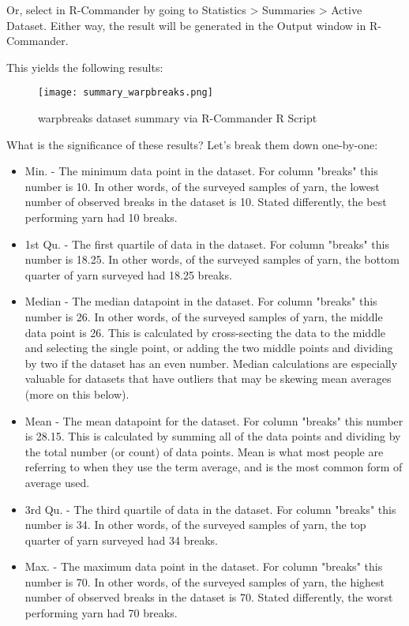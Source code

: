 Or, select in R-Commander by going to Statistics > Summaries > Active Dataset. Either way, the result will be generated in the Output window in R-Commander.

This yields the following results:

\begin{figure}[h!]
\texttt{[image: summary\_warpbreaks.png]}
 \caption{warpbreaks dataset summary via R-Commander R Script}
 \label{fig:summary_warpbreaks}
\end{figure}

What is the significance of these results? Let's break them down one-by-one:

\begin{itemize}
 \item Min. - The minimum data point in the dataset. For column "breaks" this number is 10. In other words, of the surveyed samples of yarn, the lowest number of observed breaks in the dataset is 10. Stated differently, the best performing yarn had 10 breaks.
 \item 1st Qu. - The first quartile of data in the dataset. For column "breaks" this number is 18.25. In other words, of the surveyed samples of yarn, the bottom quarter of yarn surveyed had 18.25 breaks.
 \item Median - The median datapoint in the dataset. For column "breaks" this number is 26. In other words, of the surveyed samples of yarn, the middle data point is 26. This is calculated by cross-secting the data to the middle and selecting the single point, or adding the two middle points and dividing by two if the dataset has an even number. Median calculations are especially valuable for datasets that have outliers that may be skewing mean averages (more on this below).
 \item Mean - The mean datapoint for the dataset. For column "breaks" this number is 28.15. This is calculated by summing all of the data points and dividing by the total number (or count) of data points. Mean is what most people are referring to when they use the term average, and is the most common form of average used.
 \item 3rd Qu. - The third quartile of data in the dataset. For column "breaks" this number is 34. In other words, of the surveyed samples of yarn, the top quarter of yarn surveyed had 34 breaks.
 \item Max. - The maximum data point in the dataset. For column "breaks" this number is 70. In other words, of the surveyed samples of yarn, the highest number of observed breaks in the dataset is 70. Stated differently, the worst performing yarn had 70 breaks.
\end{itemize}

